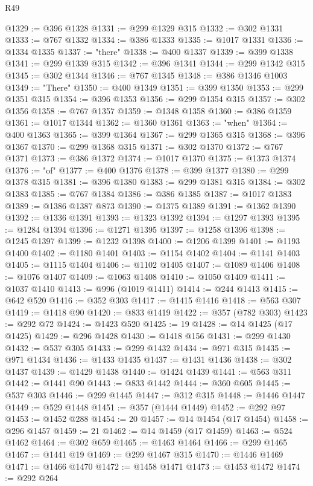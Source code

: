 \begin{lexlean}{R49}
\begin{coremodule}
@1329 := @396 @1328
@1331 := @299 @1329 @315
@1332 := @302 @1331
@1333 := @767 @1332
@1334 := @386 @1333
@1335 := @1017 @1331
@1336 := @1334 @1335
@1337 := "there"
@1338 := @400 @1337
@1339 := @399 @1338
@1341 := @299 @1339 @315
@1342 := @396 @1341
@1344 := @299 @1342 @315
@1345 := @302 @1344
@1346 := @767 @1345
@1348 := @386 @1346 @1003
@1349 := "There"
@1350 := @400 @1349
@1351 := @399 @1350
@1353 := @299 @1351 @315
@1354 := @396 @1353
@1356 := @299 @1354 @315
@1357 := @302 @1356
@1358 := @767 @1357
@1359 := @1348 @1358
@1360 := @386 @1359
@1361 := @1017 @1344
@1362 := @1360 @1361
@1363 := "when"
@1364 := @400 @1363
@1365 := @399 @1364
@1367 := @299 @1365 @315
@1368 := @396 @1367
@1370 := @299 @1368 @315
@1371 := @302 @1370
@1372 := @767 @1371
@1373 := @386 @1372
@1374 := @1017 @1370
@1375 := @1373 @1374
@1376 := "of"
@1377 := @400 @1376
@1378 := @399 @1377
@1380 := @299 @1378 @315
@1381 := @396 @1380
@1383 := @299 @1381 @315
@1384 := @302 @1383
@1385 := @767 @1384
@1386 := @386 @1385
@1387 := @1017 @1383
@1389 := @1386 @1387 @873
@1390 := @1375 @1389
@1391 := @1362 @1390
@1392 := @1336 @1391
@1393 := @1323 @1392
@1394 := @1297 @1393
@1395 := @1284 @1394
@1396 := @1271 @1395
@1397 := @1258 @1396
@1398 := @1245 @1397
@1399 := @1232 @1398
@1400 := @1206 @1399
@1401 := @1193 @1400
@1402 := @1180 @1401
@1403 := @1154 @1402
@1404 := @1141 @1403
@1405 := @1115 @1404
@1406 := @1102 @1405
@1407 := @1089 @1406
@1408 := @1076 @1407
@1409 := @1063 @1408
@1410 := @1050 @1409
@1411 := @1037 @1410
@1413 := @996 (@1019 @1411)
@1414 := @244 @1413
@1415 := @642 @520
@1416 := @352 @303
@1417 := @1415 @1416
@1418 := @563 @307
@1419 := @1418 @90
@1420 := @833 @1419
@1422 := @357 (@782 @303)
@1423 := @292 @72
@1424 := @1423 @520
@1425 := 19
@1428 := @14 @1425 (@17 @1425)
@1429 := @296 @1428
@1430 := @1418 @156
@1431 := @299 @1430
@1432 := @537 @305
@1433 := @299 @1432
@1434 := @971 @315
@1435 := @971 @1434
@1436 := @1433 @1435
@1437 := @1431 @1436
@1438 := @302 @1437
@1439 := @1429 @1438
@1440 := @1424 @1439
@1441 := @563 @311
@1442 := @1441 @90
@1443 := @833 @1442
@1444 := @360 @605
@1445 := @537 @303
@1446 := @299 @1445
@1447 := @312 @315
@1448 := @1446 @1447
@1449 := @529 @1448
@1451 := @357 (@1444 @1449)
@1452 := @292 @97
@1453 := @1452 @288
@1454 := 20
@1457 := @14 @1454 (@17 @1454)
@1458 := @296 @1457
@1459 := 21
@1462 := @14 @1459 (@17 @1459)
@1463 := @524 @1462
@1464 := @302 @659
@1465 := @1463 @1464
@1466 := @299 @1465
@1467 := @1441 @19
@1469 := @299 @1467 @315
@1470 := @1446 @1469
@1471 := @1466 @1470
@1472 := @1458 @1471
@1473 := @1453 @1472
@1474 := @292 @264

\end{coremodule}
\end{lexlean}
